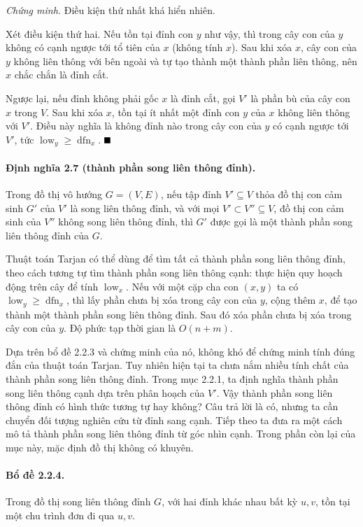 \documentclass[11pt]{article}
\providecommand{\square}{\mathord{\vcenter{\hrule height .6em width .6em}}}
\begin{document}
\emph{Chứng minh.}
Điều kiện thứ nhất khá hiển nhiên.

Xét điều kiện thứ hai. Nếu tồn tại đỉnh con $y$ như vậy, thì trong cây con của
$y$ không có cạnh ngược tới tổ tiên của $x$ (không tính $x$). Sau khi xóa $x$,
cây con của $y$ không liên thông với bên ngoài và tự tạo thành một thành phần
liên thông, nên $x$ chắc chắn là đỉnh cắt.

Ngược lại, nếu đỉnh không phải gốc $x$ là đỉnh cắt, gọi $V'$ là phần bù của cây
con $x$ trong $V$. Sau khi xóa $x$, tồn tại ít nhất một đỉnh con $y$ của $x$
không liên thông với $V'$. Điều này nghĩa là không đỉnh nào trong cây con của
$y$ có cạnh ngược tới $V'$, tức
$\operatorname{low}_y\ge\operatorname{dfn}_x$. \hfill$\square$

\paragraph{Định nghĩa 2.7 (thành phần song liên thông đỉnh).}
Trong đồ thị vô hướng $G=(V,E)$, nếu tập đỉnh $V'\subseteq V$ thỏa đồ thị con
cảm sinh $G'$ của $V'$ là song liên thông đỉnh, và với mọi
$V'\subset V''\subseteq V$, đồ thị con cảm sinh của $V''$ không song liên thông
đỉnh, thì $G'$ được gọi là một thành phần song liên thông đỉnh của $G$.

Thuật toán Tarjan có thể dùng để tìm tất cả thành phần song liên thông đỉnh, theo
cách tương tự tìm thành phần song liên thông cạnh: thực hiện quy hoạch động trên
cây để tính $\operatorname{low}_x$. Nếu với một cặp cha con $(x,y)$ ta có
$\operatorname{low}_y\ge\operatorname{dfn}_x$, thì lấy phần chưa bị xóa trong
cây con của $y$, cộng thêm $x$, để tạo thành một thành phần song liên thông
đỉnh. Sau đó xóa phần chưa bị xóa trong cây con của $y$. Độ phức tạp thời gian
là $O(n+m)$.

Dựa trên bổ đề 2.2.3 và chứng minh của nó, không khó để chứng minh tính đúng đắn
của thuật toán Tarjan. Tuy nhiên hiện tại ta chưa nắm nhiều tính chất của thành
phần song liên thông đỉnh. Trong mục 2.2.1, ta định nghĩa thành phần song liên
thông cạnh dựa trên phân hoạch của $V'$. Vậy thành phần song liên thông đỉnh có
hình thức tương tự hay không? Câu trả lời là có, nhưng ta cần chuyển đối tượng
nghiên cứu từ đỉnh sang cạnh. Tiếp theo ta đưa ra một cách mô tả thành phần song
liên thông đỉnh từ góc nhìn cạnh. Trong phần còn lại của mục này, mặc định đồ thị
không có khuyên.

\paragraph{Bổ đề 2.2.4.}
Trong đồ thị song liên thông đỉnh $G$, với hai đỉnh khác nhau bất kỳ $u,v$, tồn
tại một chu trình đơn đi qua $u,v$.
\end{document}
